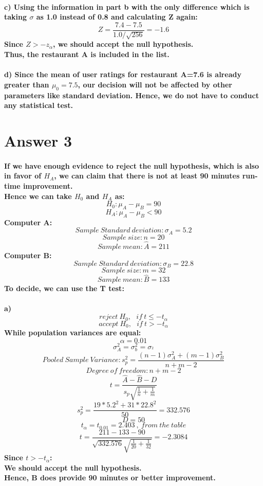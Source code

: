 \documentclass[12pt]{article}
\begin{document}
\paragraph{c)
Using the information in part b with the only difference which is taking $\sigma$ as 1.0 instead of 0.8 and calculating Z again:
\[Z=\frac{7.4-7.5}{1.0/\sqrt{256}}=-1.6\]
Since $Z>-z_\alpha$, we should accept the null hypothesis.\\ 
Thus, the restaurant A is included in the list.}
\paragraph{d)
Since the mean of user ratings for restaurant A=7.6 is already greater than $\mu_0=7.5$, our decision will not be affected by other parameters like standard deviation. Hence, we do not have to conduct any statistical test. 
}
\section*{Answer 3}
\paragraph{
If we have enough evidence to reject the null hypothesis, which is also in favor of $H_A$, we can claim that there is not at least 90 minutes run-time improvement.\\
Hence we can take $H_0$ and $H_A$ as:
\[H_0: \mu_A-\mu_B = 90\]
\[H_A:\mu_A-\mu_B < 90\]
Computer A:
\[Sample \ Standard \ deviation :\sigma_A=5.2\]
\[Sample \ size : n=20\]
\[Sample \ mean : \hat{A}=211\]
Computer B:
\[Sample \ Standard \ deviation :\sigma_B=22.8\]
\[Sample \ size : m=32\]
\[Sample \ mean : \hat{B}=133\]
To decide, we can use the T test:\\
}
\paragraph{a)
\[reject \  H_0, \ \ \ if \ t \leq -t_\alpha\]
\[accept \  H_0, \ \ \ if \ t > -t_\alpha\]
While population variances are equal:\\
\[\alpha=0.01\]
\[\sigma_{A}^{2}=\sigma_{b}^{2}=\sigma_^{2}\]
\[Pooled \ Sample \ Variance: s_p^2= \frac{(n-1)\sigma_{A}^{2}+(m-1)\sigma_{B}^{2}}{n+m-2} \]
\[Degree \ of \ freedom: n+m-2\]
\[t= \frac{\hat{A}-\hat{B}-D}{s_p\sqrt{\frac{1}{n}+\frac{1}{m}}} \]
\[s_p^2= \frac{19*5.2^{2}+31*22.8^{2}}{50}=332.576 \]
\[D=50\]
\[t_\alpha=t_{0.01}=2.403 \ , \ from \ the \ table\]
\[t=\frac{211-133-90}{\sqrt{332.576}\sqrt{\frac{1}{20}+\frac{1}{32}}}=-2.3084 \]
Since $t > -t_\alpha$:\\
We should accept the null hypothesis.\\
Hence, B does provide 90 minutes or better improvement. 
}
\end{document}
